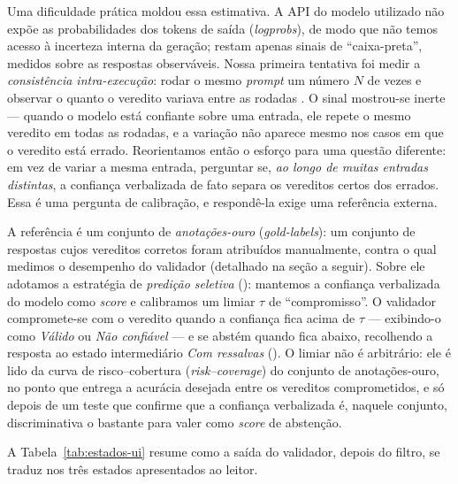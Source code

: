 Uma dificuldade prática moldou essa estimativa. A API do modelo utilizado não expõe as probabilidades dos tokens de saída (\textit{logprobs}), de modo que não temos acesso à incerteza interna da geração; restam apenas sinais de ``caixa-preta'', medidos sobre as respostas observáveis. Nossa primeira tentativa foi medir a \textit{consistência intra-execução}: rodar o mesmo \textit{prompt} um número $N$ de vezes e observar o quanto o veredito variava entre as rodadas \cite{Huang2025lookbefore}. O sinal mostrou-se inerte --- quando o modelo está confiante sobre uma entrada, ele repete o mesmo veredito em todas as rodadas, e a variação não aparece mesmo nos casos em que o veredito está errado. Reorientamos então o esforço para uma questão diferente: em vez de variar a mesma entrada, perguntar se, \textit{ao longo de muitas entradas distintas}, a confiança verbalizada de fato separa os vereditos certos dos errados. Essa é uma pergunta de calibração, e respondê-la exige uma referência externa.

A referência é um conjunto de \textit{anotações-ouro} (\textit{gold-labels}): um conjunto de respostas cujos vereditos corretos foram atribuídos manualmente, contra o qual medimos o desempenho do validador (detalhado na seção a seguir). Sobre ele adotamos a estratégia de \textit{predição seletiva} (\cite{yaniv2010selective,geifman2017selective}): mantemos a confiança verbalizada do modelo como \textit{score} e calibramos um limiar $\tau$ de ``compromisso''. O validador compromete-se com o veredito quando a confiança fica acima de $\tau$ --- exibindo-o como \textit{Válido} ou \textit{Não confiável} --- e se abstém quando fica abaixo, recolhendo a resposta ao estado intermediário \textit{Com ressalvas} (\cite{yadkori2024mitigating}). O limiar não é arbitrário: ele é lido da curva de risco--cobertura (\textit{risk--coverage}) do conjunto de anotações-ouro, no ponto que entrega a acurácia desejada entre os vereditos comprometidos, e só depois de um teste que confirme que a confiança verbalizada é, naquele conjunto, discriminativa o bastante para valer como \textit{score} de abstenção.

A Tabela~\ref{tab:estados-ui} resume como a saída do validador, depois do filtro, se traduz nos três estados apresentados ao leitor.


